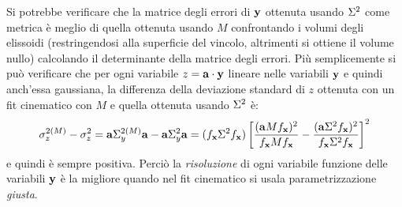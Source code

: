 Si potrebbe verificare che la matrice degli errori di ${\bf y}$ ottenuta usando $\Sigma^2$ come metrica \`e meglio di quella ottenuta usando $M$ confrontando i volumi degli elissoidi (restringendosi alla superficie del vincolo, altrimenti si
ottiene il volume nullo) calcolando il determinante della matrice degli errori.
Pi\`u semplicemente si pu\`o verificare che per ogni variabile $z={\bf a}\cdot{\bf y}$
lineare nelle variabili ${\bf y}$ e quindi anch'essa gaussiana, la differenza della
deviazione standard di $z$ ottenuta con un fit cinematico con $M$ e quella ottenuta
usando $\Sigma^2$ \`e:
\[\sigma^{2(M)}_z-\sigma^2_z={\bf a}\Sigma^{2(M)}_y{\bf a}-{\bf a}\Sigma^2_y{\bf a}=(f_{\bf x}\Sigma^2 f_{\bf x})\left[\frac{({\bf a}M f_{\bf x})^2}{f_{\bf x} M f_{\bf x}}-\frac{({\bf a}\Sigma^2 f_{\bf x})^2}{f_{\bf x} \Sigma^2 f_{\bf x}}\right]^2\]
e quindi \`e sempre positiva. Perci\`o la {\em risoluzione} di ogni variabile
funzione delle variabili ${\bf y}$ \`e la migliore quando nel fit cinematico si usala parametrizzazione {\em giusta}.
%
